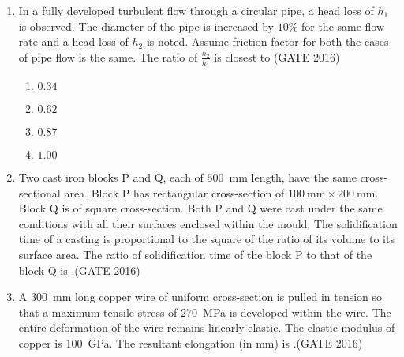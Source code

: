 \documentclass[journal,12pt,onecolumn]{IEEEtran}
\theoremstyle{remark}
\begin{document}
\begin{enumerate}
\begin{enumerate}
\end{enumerate}
\vspace{0.5cm}

\newpage
\item In a fully developed turbulent flow through a circular pipe, a head loss of $h_1$ is observed. The diameter of the pipe is increased by $10\%$ for the same flow rate and a head loss of $h_2$ is noted. Assume friction factor for both the cases of pipe flow is the same. The ratio of $\frac{h_2}{h_1}$ is closest to \hfill{(GATE 2016)}
\begin{multicols}{4}
\begin{enumerate}
    \item $0.34$
    \item $0.62$
    \item $0.87$
    \item $1.00$
\end{enumerate}
\end{multicols}
\vspace{0.5cm}

\item Two cast iron blocks P and Q, each of $500$~mm length, have the same cross-sectional area. Block P has rectangular cross-section of $100~\text{mm} \times 200~\text{mm}$. Block Q is of square cross-section. Both P and Q were cast under the same conditions with all their surfaces enclosed within the mould. The solidification time of a casting is proportional to the square of the ratio of its volume to its surface area. The ratio of solidification time of the block P to that of the block Q is \underline{\hspace{2cm}}.\hfill{(GATE 2016)}
\vspace{0.5cm}

\item A $300$~mm long copper wire of uniform cross-section is pulled in tension so that a maximum tensile stress of $270$~MPa is developed within the wire. The entire deformation of the wire remains linearly elastic. The elastic modulus of copper is $100$~GPa. The resultant elongation (in mm) is \underline{\hspace{2cm}}.\hfill{(GATE 2016)}
\vspace{0.5cm}


\end{enumerate}
\end{document}
